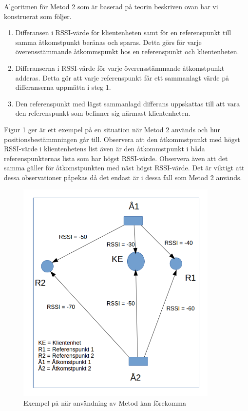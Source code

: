 \documentclass[swedish, a4paper,12pt]{article}
\begin{document}
Algoritmen för Metod 2 som är baserad på teorin beskriven ovan har vi konstruerat som följer.

\begin{enumerate}
  \item Differansen i RSSI-värde för klientenheten samt för en referenspunkt till samma åtkomstpunkt beränas och sparas. Detta görs för varje överensstämmande åtkommspunkt hos en referenspunkt och klientenheten.
  \item Differanserna i RSSI-värde för varje överensstämmande åtkomstpunkt adderas. Detta gör att varje referenspunkt får ett sammanlagt värde på differanserna uppmätta i steg 1.
  \item Den referenspunkt med lägst sammanlagd differans uppskattas till att vara den referenspunkt som befinner sig närmast klientenheten.
\end{enumerate}

Figur \ref{fig:MET2} ger är ett exempel på en situation när Metod 2 används och hur positionsbestämmningen går till.
Observera att den åtkommstpunkt med högst RSSI-värde i klientenhetens list även är den åtkommstpunkt i båda referenspunkternas lista som har högst RSSI-värde.
Observera även att det samma gäller för åtkomstpunkten med näst högst RSSI-värde.
Det är viktigt att dessa observationer påpekas då det endast är i dessa fall som Metod 2 används.

\begin{figure}[H]
  \centering
  \includegraphics[width=10cm]{media/MET2.png}
  \caption{Exempel på när användning av Metod kan förekomma}
  \label{fig:MET2}
\end{figure}
\end{document}
